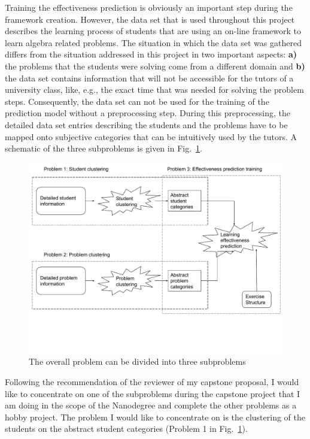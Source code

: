 Training the effectiveness prediction is obviously an important step during the framework creation. However, the data set that is used throughout this project describes the learning process of students that are using an on-line framework to learn algebra related problems. The situation in which the data set was gathered differs from the situation addressed in this project in two important aspects: \textbf{a)} the problems that the students were solving come from a different domain and  \textbf{b)} the data set contains information that will not be accessible for the tutors of a university class, like, e.g., the exact time that was needed for solving the problem steps. Consequently, the data set can not be used for the training of the prediction model without a preprocessing step. During this preprocessing, the detailed data set entries describing the students and the problems have to be mapped onto subjective categories that can be intuitively used by the tutors. A schematic of the three subproblems is given in Fig.~\ref{fig_sub_problems}.

  \begin{figure}
  	\centering
  	\includegraphics[width=\textwidth]{./img/subProblems.pdf}
  	\caption{The overall problem can be divided into three subproblems \label{fig_sub_problems}}
  \end{figure}
  
Following the recommendation of the reviewer of my capstone proposal, I would like to concentrate on one of the subproblems during the capstone project that I am doing in the scope of the Nanodegree and complete the other problems as a hobby project. The problem I would like to concentrate on is the clustering of the students on the abstract student categories (Problem 1 in Fig.~\ref{fig_sub_problems}).

